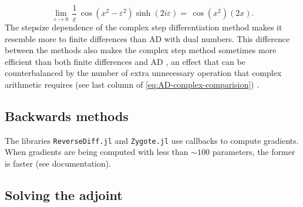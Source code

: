 \begin{equation}
    \lim_{\varepsilon \rightarrow 0} \, \frac{1}{\varepsilon} \, \cos(x^2 - \varepsilon^2) \sinh (2i\varepsilon) 
    = 
    \, \cos(x^2) (2x).
\end{equation}
The stepsize dependence of the complex step differentiation method makes it resemble more to finite differences than AD with dual numbers. 
This difference between the methods also makes the complex step method sometimes more efficient than both finite differences and AD \cite{Lantoine_Russell_Dargent_2012}, an effect that can be counterbalanced by the number of extra unnecessary operation that complex arithmetic requires (see last column of \eqref{eq:AD-complex-comparision}) \cite{Martins_Sturdza_Alonso_2003_complex_differentiation}.

\subsection{Backwards methods}

The libraries \texttt{ReverseDiff.jl} and \texttt{Zygote.jl} use callbacks to compute gradients. When gradients are being computed with less than $\sim 100$ parameters, the former is faster (see documentation).

\subsection{Solving the adjoint}

